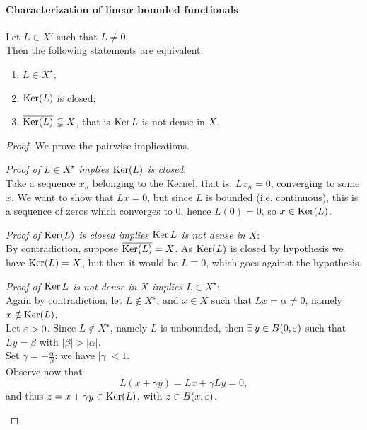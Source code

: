 \paragraph{Characterization of linear bounded functionals}
\begin{theo}
	Let $L \in X'$ such that $L \neq 0$.\\
	Then the following statements are equivalent:
	\begin{enumerate}
		\item $L \in  X^\star$;
		\item $\Ker(L)$ is closed;
		\item $\overline{\Ker(L)} \subsetneq X$, that is $\Ker{L}$ is not dense in $X$.
	\end{enumerate}
	\label{theo-charact-bdd-functionals}
\end{theo}
\begin{proof} We prove the pairwise implications.
	
	\textit{Proof of $L \in X^\star$ implies $\Ker(L)$ is closed}:\\
	Take a sequence $x_{n}$ belonging to the Kernel, that is, $Lx_{n}=0$, converging to some $x$. We want to show that $Lx=0$, but since $L$ is bounded (i.e. continuous), this is a sequence of zeros which converges to $0$, hence $L(0)=0$, so $x\in \Ker(L)$.
	
	\textit{Proof of $\Ker(L)$ is closed implies $\Ker{L}$ is not dense in $X$}:\\	
	By contradiction, suppose $\overline{\Ker(L)} =X$. As $\Ker(L)$ is closed by hypothesis we have $\Ker(L) = X$, but then it would be $L \equiv 0$, which goes against the hypothesis.
	
	\textit{Proof of $\Ker{L}$ is not dense in $X$ implies $L \in X^\star$}:\\	
	Again by contradiction, let $L \notin X^\star$, and $x \in X$ such that $Lx = \alpha \neq 0$, namely $x \notin \Ker(L)$.\\	
	Let $\eps > 0$. Since $L \notin X^\star$, namely $L$ is unbounded, then $\exists \, y \in B(0,\eps)$ such that $Ly = \beta$ with $|\beta|>|\alpha|$.\\
	Set $\gamma = -\frac \alpha \beta$: we have $|\gamma|<1$.\\
	Observe now that 
	$$
		L(x + \gamma y) 
		= Lx + \gamma Ly 
		= 0
		,
	$$ and thus $z = x+\gamma y \in \Ker(L)$, with $z \in B(x,\eps)$.\\
	\begin{figure}[htpb]
		\centering
		\begin{tikzpicture}[x=0.75pt,y=0.75pt,yscale=-0.7,xscale=0.7]


\end{tikzpicture}
\end{figure}
\end{proof}
